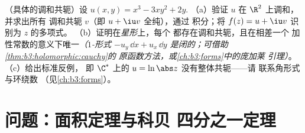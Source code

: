 \begin{exercise}[$\star\star$]\label{exo:b3:conformal:12}
（具体的调和共轭）设 $u(x, y) = x^3 - 3xy^2
+ 2y$.
（a）验证 $u$ 在 $\R^2$ 上调和，并求出所有
调和共轭 $v$（即 $u + \iu v$ 全纯），通过
积分；将 $f(z) =
u + \iu v$ 识别为 $z$ 的多项式。
（b）证明在\emph{星形}上，每个
都存在调和共轭，且在相差一个
加性常数的意义下唯一\emph{（$1$-形式 $-u_y\,\dd x +
u_x\,\dd y$ 是闭的；可借助\cref{thm:b3:holomorphic:cauchy}的
原函数方法，或\cref{ch:b3:forms}中的庞加莱
引理）}。
（c）给出标准反例，
即 $\C^*$ 上的 $u = \ln\abs z$ 没有整体共轭——请
联系角形式与环绕数
（见\cref{ch:b3:forms}）。
\end{exercise}

\section{问题：面积定理与科贝
四分之一定理}

